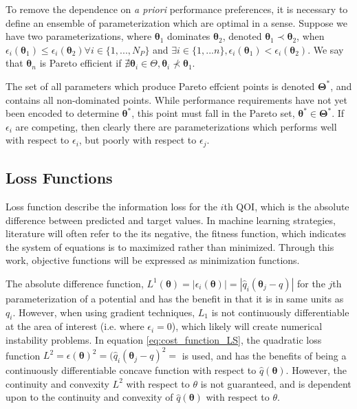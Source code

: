 To remove the dependence on \emph{a priori} performance preferences, it is necessary to define an ensemble of parameterization which are optimal in a sense.
Suppose we have two parameterizations,
where $\bm{\theta}_1$ dominates $\bm{\theta}_2$,
denoted $\bm{\theta}_1 \prec \bm{\theta}_2$,
when $\epsilon_i(\bm{\theta}_1) \leq \epsilon_i(\bm{\theta}_2) \forall i \in \{1,...,N_P\}$ and $\exists i \in \{1,...n\}, \epsilon_i(\bm{\theta}_1) < \epsilon_i(\bm{\theta}_2)$.
We say that $\bm{\theta}_n$ is Pareto efficient if $\nexists \bm{\theta}_i \in \Theta, \bm{\theta}_i \nprec \bm{\theta}_1$.

The set of all parameters which produce Pareto effcient points is denoted $\bm{\Theta}^*$, and contains all non-dominated points.  While performance requirements have not yet been encoded to determine $\bm{\theta}^*$, this point must fall in the Pareto set, $\bm{\theta}^* \in \bm{\Theta}^*$.  If $\epsilon_i$ are competing, then clearly there are parameterizations which performs well with respect to $\epsilon_i$, but poorly with respect to $\epsilon_j$.

\subsection{Loss Functions}
Loss function describe the information loss for the $i$th QOI, which is the absolute difference between predicted and target values.  In machine learning strategies, literature will often refer to the its negative, the fitness function, which indicates the system of equations is to maximized rather than minimized.  Through this work, objective functions will be expressed as minimization functions.

The absolute difference function,  $L^1(\bm{\theta})=| \epsilon_i(\bm{\theta}) | = |\hat{q}_i(\bm{\theta}_j-q)|$ for the $j$th parameterization of a potential and has the benefit in that it is in same units as $q_i$.  However, when using gradient techniques, $L_1$ is not continuously differentiable at the area of interest (i.e. where $\epsilon_i =0$), which likely will create numerical instability problems.  In equation \ref{eq:cost_function_LS}, the quadratic loss function
$L^2
		=\epsilon(\bm{\theta})^2
		=(\hat{q}_i(\bm{\theta}_j-q)^2=$
is used, and has the benefits of being a continuously differentiable concave function with respect to $\hat{q}(\bm{\theta})$.  However, the continuity and convexity $L^2$ with respect to $\theta$ is not guaranteed, and is dependent upon to the continuity and convexity of $\hat{q}(\bm{\theta})$ with respect to $\theta$.

